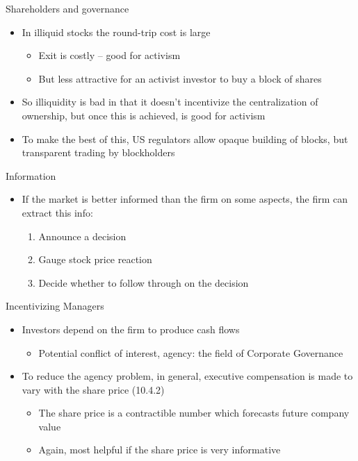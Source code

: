 \documentclass[english,10pt
,aspectratio=169
]{beamer}
\begin{document}
\begin{frame}{Shareholders and governance}
	\begin{itemize}
		\item In illiquid stocks the round-trip cost is large
		\begin{itemize}
			\item Exit is costly -- good for activism
			\item But less attractive for an activist investor to buy a block of shares
		\end{itemize}
		\item So illiquidity is bad in that it doesn't incentivize the centralization of ownership, but once this is achieved, is good for activism
		\item To make the best of this, US regulators allow opaque building of blocks, but transparent trading by blockholders
	\end{itemize}
\end{frame}


\begin{frame}{Information}
	\begin{itemize}
		\item If the market is better informed than the firm on some aspects, the firm can extract this info:
		\begin{enumerate}
			\item Announce a decision
			\item Gauge stock price reaction
			\item Decide whether to follow through on the decision
		\end{enumerate}
	\end{itemize}
\end{frame}


\begin{frame}{Incentivizing Managers}
	\begin{itemize}
		\item Investors depend on the firm to produce cash flows 
		\begin{itemize}
			\item Potential conflict of interest, agency: the field of Corporate Governance
		\end{itemize}
		\item To reduce the agency problem, in general, executive compensation is made to vary with the share price (10.4.2)
		\begin{itemize}
			\item The share price is a contractible number which forecasts future company value
			\item Again, most helpful if the share price is very informative
		\end{itemize}
	\end{itemize}
\end{frame}
\end{document}
